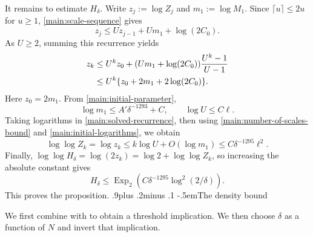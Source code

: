 \documentclass[twoside]{aomart}
\makeatletter
\theoremstyle{paperplain}
\theoremstyle{paperdefinition}
\renewcommand\subsection{\@startsection{subsection}{2}{\z@}
  {.9\baselineskip plus .2\baselineskip minus .1\baselineskip}
  {-.5em}{\normalfont\bfseries}}
\renewenvironment{proof}[1][\proofname]{\par\pushQED{\qed}%
  \normalfont\topsep6\p@\@plus3\p@\relax\trivlist
  \item[\hskip\labelsep\itshape #1\@addpunct{.}]\ignorespaces
}{\popQED\endtrivlist\@endpefalse}
\numberwithin{equation}{section}
\makeatother
\begin{document}
\begin{proof}
It remains to estimate $H_\delta$.  Write
$z_j:=\log Z_j$ and $m_1:=\log M_1$.  Since
$\lceil u\rceil\le2u$ for $u\ge1$, \eqref{main:scale-sequence} gives
\begin{equation*}
 z_j\le Uz_{j-1}+Um_1+\log(2C_0).
\end{equation*}
As $U\ge2$, summing this recurrence yields
\begin{align}
 z_k
 &\le U^kz_0+(Um_1+\log(2C_0))\frac{U^k-1}{U-1}\notag\\
 &\le U^k\{z_0+2m_1+2\log(2C_0)\}.
 \label{main:solved-recurrence}
\end{align}
Here $z_0=2m_1$.  From \eqref{main:initial-parameter},
\begin{equation}
 \log m_1\le A'\delta^{-1293}+C,
 \qquad \log U\le C\ell.
 \label{main:initial-logarithms}
\end{equation}
Taking logarithms in \eqref{main:solved-recurrence}, then using
\eqref{main:number-of-scales-bound} and \eqref{main:initial-logarithms},
we obtain
\[
 \log\log Z_k=\log z_k
 \le k\log U+O(\log m_1)
 \le C\delta^{-1295}\ell^2.
\]
Finally,
$\log\log H_\delta=\log(2z_k)=\log2+\log\log Z_k$, so increasing the
absolute constant gives
\[
 H_\delta\le\operatorname{Exp}_2
 \left(C\delta^{-1295}\log^2(2/\delta)\right).
\]
This proves the proposition.
\end{proof}
\subsection{The density bound}

We first combine  with
 to obtain a threshold implication.
We then choose $\delta$ as a function of $N$ and invert that implication.
\end{document}

